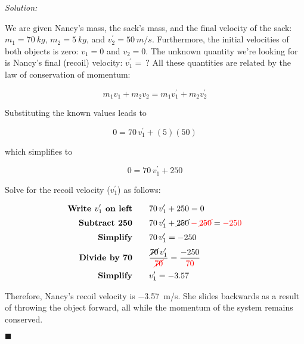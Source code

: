 \documentclass[dvipsnames]{article}
\begin{document}
\textit{Solution:} 

We are given Nancy's mass, the sack's mass, and the final velocity of the sack: $m_1 = \SI{70}{kg}$, $m_2 = \SI{5}{kg}$, and $v_2^{\prime} = \SI{50}{m/s}$. Furthermore, the initial velocities of both objects is zero: $v_1 = 0$ and $v_2 = 0$. The unknown quantity we're looking for is Nancy's final (recoil) velocity: $v_1^{\prime} =\ ?$ All these quantities are related by the law of conservation of momentum:

\begin{equation*}
    m_1 v_1 + m_2 v_2 = m_1 v_1^{\prime} + m_2 v_2^{\prime}
\end{equation*}

Substituting the known values leads to 

\begin{equation*}
    0 = 70\,v_1^{\prime} + (5)(50)
\end{equation*}

 which simplifies to 

 \begin{equation*}
     0 = 70\,v_1^{\prime} + 250
 \end{equation*}

 Solve for the recoil velocity ($v_1^{\prime}$) as follows:

 \begin{align*}
     \textbf{Write $v_1^{\prime}$ on left} \qquad & 70\,v_1^{\prime} + 250 = 0\\[0.5ex]
     \textbf{Subtract 250} \qquad & 70\,v_1^{\prime} + \cancel{250} \mathbin{\color{red} - } \textcolor{red}{\cancel{250}} = \mathbin{\color{red} - } \textcolor{red}{250}\\[0.5ex]
     \textbf{Simplify} \qquad &  70\,v_1^{\prime} = -250\\[0.5ex]
     \textbf{Divide by 70} \qquad & \frac{\cancel{70}\,v_1^{\prime}}{\textcolor{red}{\cancel{70}}} = \frac{-250}{\textcolor{red}{70}}\\[0.5ex]
     \textbf{Simplify} \qquad & v_1^{\prime} = -3.57\\
 \end{align*}

Therefore, Nancy's recoil velocity is \SI{-3.57}{m/s}. She slides backwards as a result of throwing the object forward, all while the momentum of the system remains conserved.
 
\hfill $\blacksquare$ 
\end{document}
